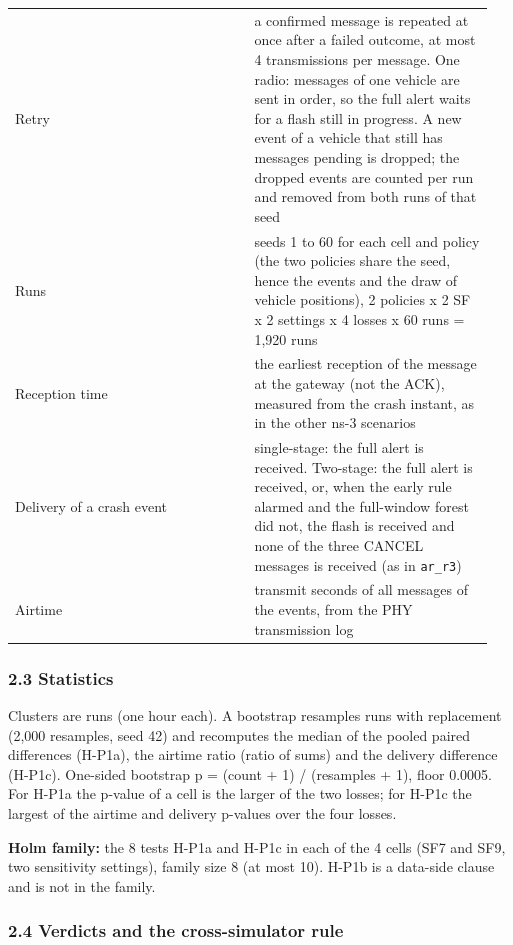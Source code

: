 {\begin{longtable}{p{0.475\linewidth}p{0.475\linewidth}}
Retry & a confirmed message is repeated at once after a failed outcome, at most 4 transmissions per message. One radio: messages of one vehicle are sent in order, so the full alert waits for a flash still in progress. A new event of a vehicle that still has messages pending is dropped; the dropped events are counted per run and removed from both runs of that seed \\
Runs & seeds 1 to 60 for each cell and policy (the two policies share the seed, hence the events and the draw of vehicle positions), 2 policies x 2 SF x 2 settings x 4 losses x 60 runs = 1,920 runs \\
Reception time & the earliest reception of the message at the gateway (not the ACK), measured from the crash instant, as in the other ns-3 scenarios \\
Delivery of a crash event & single-stage: the full alert is received. Two-stage: the full alert is received, or, when the early rule alarmed and the full-window forest did not, the flash is received and none of the three CANCEL messages is received (as in \texttt{ar\_r3}) \\
Airtime & transmit seconds of all messages of the events, from the PHY transmission log \\
\bottomrule
\end{longtable}}

\subsubsection*{2.3 Statistics}

Clusters are runs (one hour each). A bootstrap resamples runs with replacement (2,000 resamples, seed 42) and recomputes the median of the pooled paired differences (H-P1a), the airtime ratio (ratio of sums) and the delivery difference (H-P1c). One-sided bootstrap p = (count + 1) / (resamples + 1), floor 0.0005. For H-P1a the p-value of a cell is the larger of the two losses; for H-P1c the largest of the airtime and delivery p-values over the four losses.

\textbf{Holm family:} the 8 tests H-P1a and H-P1c in each of the 4 cells (SF7 and SF9, two sensitivity settings), family size 8 (at most 10). H-P1b is a data-side clause and is not in the family.

\subsubsection*{2.4 Verdicts and the cross-simulator rule}

